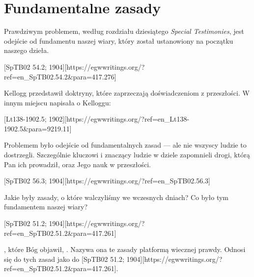 \chapter{Fundamentalne zasady}

Prawdziwym problemem, według rozdziału dziesiątego \textit{Special Testimonies}, jest odejście od fundamentu naszej wiary, który został ustanowiony na początku naszego dzieła.

[SpTB02 54.2; 1904][https://egwwritings.org/?ref=en\_SpTB02.54.2&para=417.276]

Kellogg przedstawił doktryny, które zaprzeczają doświadczeniom z przeszłości. W innym miejscu napisała o Kelloggu:

[Lt138-1902.5; 1902][https://egwwritings.org/?ref=en\_Lt138-1902.5&para=9219.11]

Problemem było odejście od fundamentalnych zasad — ale nie wszyscy ludzie to dostrzegli. Szczególnie kluczowi i znaczący ludzie w dziele zapomnieli drogi, którą Pan ich prowadził, oraz Jego nauk w przeszłości.

[SpTB02 56.3; 1904][https://egwwritings.org/?ref=en\_SpTB02.56.3]

Jakie były zasady, o które walczyliśmy we wczesnych dniach? Co było tym fundamentem naszej wiary?

[SpTB02 51.2; 1904][https://egwwritings.org/?ref=en\_SpTB02.51.2&para=417.261]

, które Bóg objawił, . Nazywa ona te zasady platformą wiecznej prawdy. Odnosi się do tych zasad jako do [SpTB02 51.2; 1904][https://egwwritings.org/?ref=en\_SpTB02.51.2&para=417.261].

